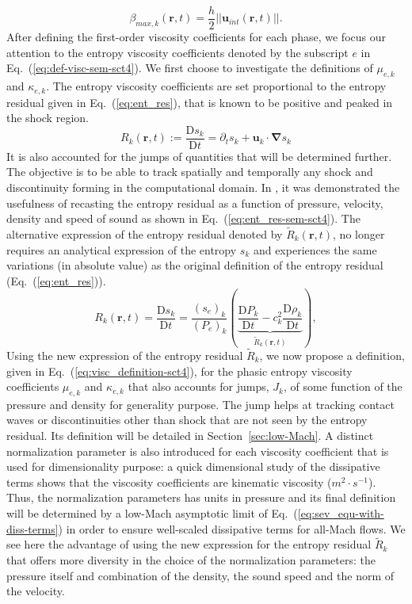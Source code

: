 \documentclass[preprint,10pt]{elsarticle}
\newcommand{\grad}{\mbold{\nabla}}
\newcommand{\mbold}[1]{\boldsymbol#1}
\newcommand{\resi}{R}
\newcommand{\resinew}{\widetilde{\resi}}
\newcommand{\matder}[1]{\frac{\textrm{D} #1}{\textrm{D} t}}
\newcommand{\eqt}[1]{Eq.~(\ref{#1})}                     %
\newcommand{\sct}[1]{Section~\ref{#1}}                   %
\begin{document}
%
%
\begin{equation}\label{eq:def-beta-max-sen-sect4}
\beta_{max,k}( \mbold r, t) = \frac{h}{2} || \mbold u_{int}( \mbold r, t) ||.
\end{equation}
%
After defining the first-order viscosity coefficients for each phase, we focus our attention to the entropy viscosity coefficients denoted by the subscript $e$ in \eqt{eq:def-visc-sem-sct4}. We first choose to investigate the definitions of $\mu_{e,k}$ and $\kappa_{e,k}$. The entropy viscosity coefficients are set proportional to the entropy residual given in \eqt{eq:ent_res}, that is known to be positive and peaked in the shock region. 
%
\begin{equation}\label{eq:ent_res}
\resi_k(\mbold r,t) := \matder{s_k} =  \partial_t s_k + \mbold u_k \cdot \grad s_k
\end{equation}
%
It is also accounted for the jumps of quantities that will be determined further. The objective is to be able to track spatially and temporally any shock and discontinuity forming in the computational domain. In \cite{Marco_paper_low_mach}, it was demonstrated the usefulness of recasting the entropy residual as a function of pressure, velocity, density and speed of sound as shown in \eqt{eq:ent_res-sem-sct4}. The alternative expression of the entropy residual denoted by $\resinew_k(\mbold r,t)$, no longer requires an analytical expression of the entropy $s_k$ and experiences the same variations (in absolute value) as the original definition of the entropy residual (\eqt{eq:ent_res}).
%
\begin{equation}\label{eq:ent_res-sem-sct4}
\resi_k(\mbold r,t)  = \matder{s_k} = \frac{(s_e)_k}{(P_e)_k} \left( \underbrace{\matder{P_k} - c_k^2 \matder{\rho_k} }_{\resinew_k(\mbold r,t)} \right) ,
\end{equation} 
%
Using the new expression of the entropy residual $\resinew_k$, we now propose a definition, given in \eqt{eq:visc_definition-sct4}, for the phasic entropy viscosity coefficients $\mu_{e,k}$ and $\kappa_{e,k}$ that also accounts for jumps, $J_k$, of some function of the pressure and density for generality purpose. The jump helps at tracking contact waves or discontinuities other than shock that are not seen by the entropy residual. Its definition will be detailed in \sct{sec:low-Mach}. A distinct normalization parameter is also introduced for each viscosity coefficient that is used for dimensionality purpose: a quick dimensional study of the dissipative terms shows that the viscosity coefficients are kinematic viscosity ($m^2 \cdot s^{-1}$). Thus, the normalization parameters has units in pressure and its final definition will be determined by a low-Mach asymptotic limit of \eqt{eq:sev_equ-with-diss-terms} in order to ensure well-scaled dissipative terms for all-Mach flows. We see here the advantage of using the new expression for the entropy residual $\resinew_k$ that offers more diversity in the choice of the normalization parameters: the pressure itself and combination of the density, the sound speed and the norm of the velocity.
\end{document}
